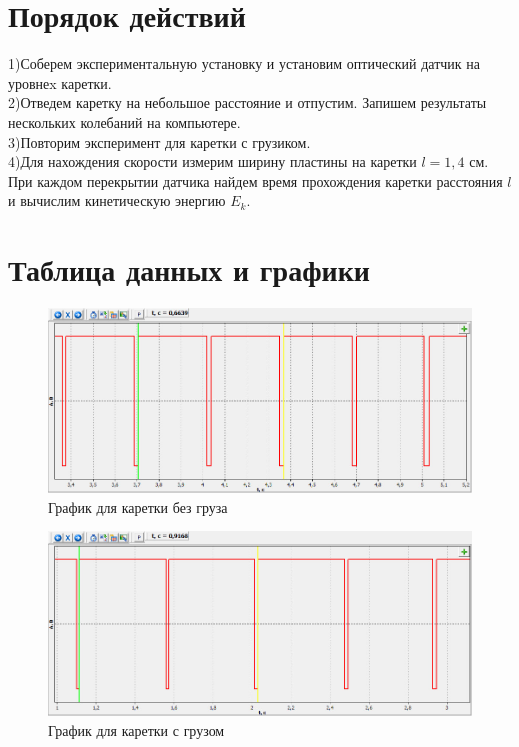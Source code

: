 \documentclass[12pt]{article}
\begin{document}
\section{Порядок действий}
1)Соберем экспериментальную установку и установим оптический датчик на уровнеx каретки.\\
2)Отведем каретку на небольшое расстояние и отпустим. Запишем результаты нескольких колебаний на компьютере.\\
3)Повторим эксперимент для каретки с грузиком.\\
4)Для нахождения скорости измерим ширину пластины на каретки $l=1{,}4$ см. При каждом перекрытии датчика найдем время прохождения каретки расстояния $l$ и вычислим кинетическую энергию $E_k$. 
\section{Таблица данных и графики}
\begin{figure}[h!]
	\includegraphics[scale=1.5]{graph1}
	\caption{График для каретки без груза}
\end{figure}
\begin{figure}[h!]
	\includegraphics[scale=1.5]{graph2}
	\caption{График для каретки  с грузом}
\end{figure}
\end{document}
